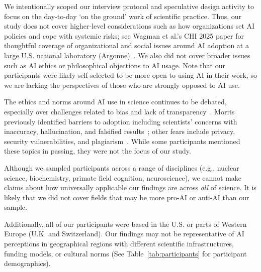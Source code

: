 We intentionally scoped our interview protocol and speculative design activity to focus on the day-to-day `on the ground' work of scientific practice. Thus, our study does not cover higher-level considerations such as how organizations set AI policies and cope with systemic risks; see Wagman et al.'s CHI 2025 paper for thoughtful coverage of organizational and social issues around AI adoption at a large U.S. national laboratory (Argonne)~\cite{wagman2025generative}. We also did not cover broader issues such as AI ethics or philosophical objections to AI usage. Note that our participants were likely self-selected to be more open to using AI in their work, so we are lacking the perspectives of those who are strongly opposed to AI use. 

The ethics and norms around AI use in science continues to be debated, especially over challenges related to bias and lack of transparency~\cite{ding2025generative}. Morris previously identified barriers to adoption including scientists' concerns with inaccuracy, hallucination, and falsified results~\cite{morris2023scientists}; other fears include privacy, security vulnerabilities, and plagiarism~\cite{wagman2025generative, nature2025aiwriting}. While some participants mentioned these topics in passing, they were not the focus of our study. 

Although we sampled participants across a range of disciplines (e.g., nuclear science, biochemistry, primate field cognition, neuroscience), we cannot make claims about how universally applicable our findings are across \emph{all} of science. It is likely that we did not cover fields that may be more pro-AI or anti-AI than our sample. 

Additionally, all of our participants were based in the U.S. or parts of Western Europe (U.K. and Switzerland). Our findings may not be representative of AI perceptions in geographical regions with different scientific infrastructures, funding models, or cultural norms (See Table~\ref{tab:participants} for participant demographics).

